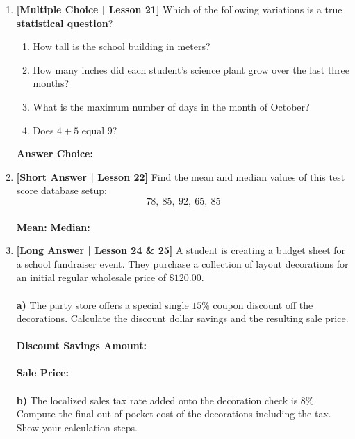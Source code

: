 \documentclass[12pt, letterpaper, fleqn]{article}
\newcommand{\blankshorter}{\underline{\hspace{2.0cm}}}
\newcommand{\blanklong}{\underline{\hspace{6.5cm}}}
\begin{document}
\begin{enumerate}[leftmargin=0.6cm, itemsep=1.2cm, start=16]

\item \textbf{[Multiple Choice | Lesson 21]} Which of the following variations is a true \textbf{statistical question}?
\begin{enumerate}[label=\Alph*)]
    \item How tall is the school building in meters?
    \item How many inches did each student's science plant grow over the last three months?
    \item What is the maximum number of days in the month of October?
    \item Does $4 + 5$ equal $9$?
\end{enumerate}
\textbf{Answer Choice:} \blankshorter

\newpage

\item \textbf{[Short Answer | Lesson 22]} Find the mean and median values of this test score database setup: 
$$78, \ 85, \ 92, \ 65, \ 85$$
\vspace{1.5cm} \\
\textbf{Mean:} \blanklong \quad \textbf{Median:} \blanklong

\item \textbf{[Long Answer | Lesson 24 \& 25]} A student is creating a budget sheet for a school fundraiser event. They purchase a collection of layout decorations for an initial regular wholesale price of $\$120.00$. 
\\ \\
\textbf{a)} The party store offers a special single $15\%$ coupon discount off the decorations. Calculate the discount dollar savings and the resulting sale price.
\\ \\
\textbf{Discount Savings Amount:} \blanklong \\ \\
\textbf{Sale Price:} \blanklong \\ \\
\textbf{b)} The localized sales tax rate added onto the decoration check is $8\%$. Compute the final out-of-pocket cost of the decorations including the tax. Show your calculation steps.

\vspace{3cm}

\end{enumerate}
\end{document}
